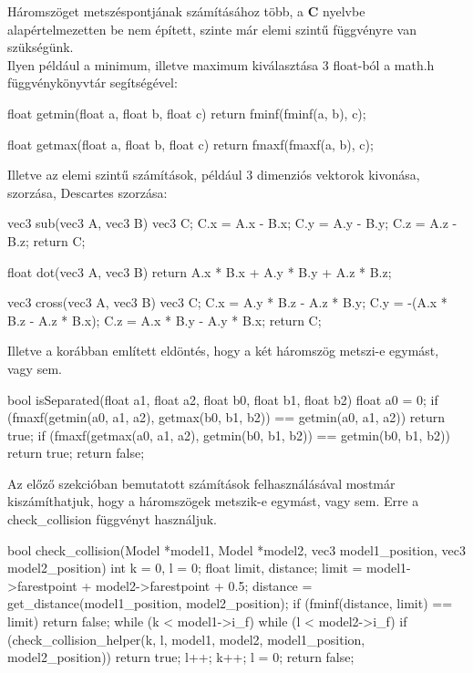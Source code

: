 Háromszöget metszéspontjának számításához több, a \textbf{C} nyelvbe alapértelmezetten be nem épített, szinte már elemi szintű függvényre van szükségünk. \\
Ilyen például a minimum, illetve maximum kiválasztása 3 float-ból a math.h függvénykönyvtár segítségével:

\begin{cpp}
float getmin(float a, float b, float c)
{
    return fminf(fminf(a, b), c);
}

float getmax(float a, float b, float c)
{
    return fmaxf(fmaxf(a, b), c);
}
\end{cpp}
Illetve az elemi szintű számítások, például 3 dimenziós vektorok kivonása, szorzása, Descartes szorzása:

\begin{cpp}
vec3 sub(vec3 A, vec3 B)
{
    vec3 C;
    C.x = A.x - B.x;
    C.y = A.y - B.y;
    C.z = A.z - B.z;
    return C;
}
	
float dot(vec3 A, vec3 B)
{
    return A.x * B.x + A.y * B.y + A.z * B.z;
}
\end{cpp}
\newpage
\begin{cpp}
vec3 cross(vec3 A, vec3 B)
{
    vec3 C;
    C.x = A.y * B.z - A.z * B.y;
    C.y = -(A.x * B.z - A.z * B.x);
    C.z = A.x * B.y - A.y * B.x;
    return C;
}
\end{cpp}
Illetve a korábban említett eldöntés, hogy a két háromszög metszi-e egymást, vagy sem.

\begin{cpp}
bool isSeparated(float a1, float a2, float b0, float b1, float b2)
{
    float a0 = 0;
    if (fmaxf(getmin(a0, a1, a2), getmax(b0, b1, b2)) 
    == getmin(a0, a1, a2))
    {
        return true;
    }
    if (fmaxf(getmax(a0, a1, a2), getmin(b0, b1, b2)) 
    == getmin(b0, b1, b2))
    {
        return true;
    }
    return false;
}
\end{cpp}
\newpage
{}

Az előző szekcióban bemutatott számítások felhasználásával mostmár kiszámíthatjuk, hogy a háromszögek metszik-e egymást, vagy sem. Erre a check\_collision függvényt használjuk.

\begin{cpp}
bool check_collision(Model *model1, Model *model2, vec3 model1_position,
vec3 model2_position)
{
    int k = 0, l = 0;
    float limit, distance;
    limit = model1->farestpoint + model2->farestpoint + 0.5;
    distance = get_distance(model1_position, model2_position);
    if (fminf(distance, limit) == limit)
    {
        return false;
    }
    while (k < model1->i_f)
    {
        while (l < model2->i_f)
        {
            if (check_collision_helper(k, l, model1, model2, 
            model1_position, model2_position))
            {
                return true;
            }
            l++;
        }
        k++;
        l = 0;
    }
	return false;
}
\end{cpp}

